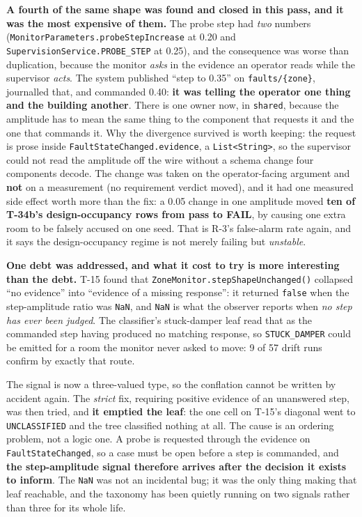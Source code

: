 \textbf{A fourth of the same shape was found and closed in this pass, and it was the most expensive
of them.} The probe step had \emph{two} numbers (\texttt{MonitorParameters.probeStepIncrease} at
0.20 and \texttt{SupervisionService.PROBE\_STEP} at 0.25), and the consequence was worse than
duplication, because the monitor \emph{asks} in the evidence an operator reads while the supervisor
\emph{acts}. The system published ``step to 0.35'' on \texttt{faults/\{zone\}}, journalled that, and
commanded 0.40: \textbf{it was telling the operator one thing and the building another}. There is one
owner now, in \texttt{shared}, because the amplitude has to mean the same thing to the component that
requests it and the one that commands it. Why the divergence survived is worth keeping: the request
is prose inside \texttt{FaultStateChanged.evidence}, a \texttt{List<String>}, so the supervisor could
not read the amplitude off the wire without a schema change four components decode. The change was
taken on the operator-facing argument and \textbf{not} on a measurement (no requirement verdict
moved), and it had one measured side effect worth more than the fix: a 0.05 change in one amplitude
moved \textbf{ten of T-34b's design-occupancy rows from pass to FAIL}, by causing one extra room to be
falsely accused on one seed. That is R-3's false-alarm rate again, and it says the design-occupancy
regime is not merely failing but \emph{unstable}.

\textbf{One debt was addressed, and what it cost to try is more interesting than the debt.}
T-15 found that \texttt{ZoneMonitor.stepShapeUnchanged()} collapsed ``no evidence'' into ``evidence
of a missing response'': it returned \texttt{false} when the step-amplitude ratio was \texttt{NaN},
and \texttt{NaN} is what the observer reports when \emph{no step has ever been judged}. The
classifier's stuck-damper leaf read that as the commanded step having produced no matching
response, so \texttt{STUCK\_DAMPER} could be emitted for a room the monitor never asked to move:
9 of 57 drift runs confirm by exactly that route.

The signal is now a three-valued type, so the conflation cannot be written by accident again. The
\emph{strict} fix, requiring positive evidence of an unanswered step, was then tried, and
\textbf{it emptied the leaf}: the one cell on T-15's diagonal went to \texttt{UNCLASSIFIED} and the
tree classified nothing at all. The cause is an ordering problem, not a logic one. A probe is
requested through the evidence on \texttt{FaultStateChanged}, so a case must be open before a step
is commanded, and \textbf{the step-amplitude signal therefore arrives after the decision it exists
to inform}. The \texttt{NaN} was not an incidental bug; it was the only thing making that leaf
reachable, and the taxonomy has been quietly running on two signals rather than three for its whole
life.

